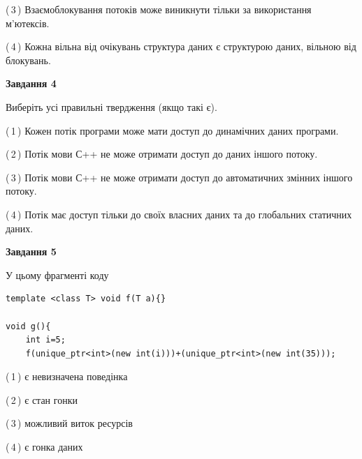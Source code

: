 \documentclass[12pt, ukrainian]{article}
\begin{document}
\begin {large}
{(\,3\,) Взаємоблокування потоків може виникнути тільки за використання м’ютексів.%

(\,4\,) Кожна вільна від очікувань структура даних є структурою даних, вільною від блокувань.%



\begin{center}
\textbf{Завдання 4}
\end{center}
Виберіть усі правильні твердження (якщо такі є).\par
\vspace{2mm}

(\,1\,) Кожен потік програми може мати доступ до динамічних даних програми.%

(\,2\,) Потік мови С++ не може отримати доступ до даних іншого потоку.%

(\,3\,) Потік мови С++ не може отримати доступ до автоматичних змінних іншого потоку.%

(\,4\,) Потік має доступ тільки до своїх власних даних та до глобальних статичних даних.%



\begin{center}
\textbf{Завдання 5}
\end{center}
У цьому фрагменті коду
\begin{verbatim}
template <class T> void f(T a){}

void g(){
    int i=5;
    f(unique_ptr<int>(new int(i)))+(unique_ptr<int>(new int(35)));
\end{verbatim}
(\,1\,) є невизначена поведінка%

(\,2\,) є стан гонки%

(\,3\,) можливий виток ресурсів%

(\,4\,) є гонка даних%


}
\end {large}
\end{document}
